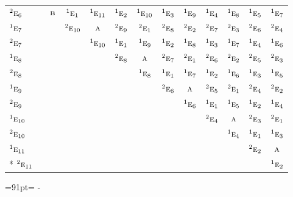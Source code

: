 \documentclass[10pt,a4paper]{article}
\newcommand{\needspace}[1]{\par\penalty-100\begingroup\dimen0=#1\relax\dimen2=\pagegoal
  \advance\dimen2-\pagetotal\ifdim\dimen0>\dimen2\relax\ifdim\dimen2>0pt\vfil\break\fi\fi
  \endgroup}
\numberwithin{equation}{section}
\newcommand{\irr}[1]{\text{\normalfont\scshape #1}}
\newcommand{\conjpair}[1]{{}^{#1}}
\begin{document}
{\begin{longtable}{@{}lcccccccccccc@{}}
$\conjpair{2}\irr{e}_{6}$ &  & $\irr{b}$ & $\conjpair{1}\irr{e}_{1}$ & $\conjpair{1}\irr{e}_{11}$ & $\conjpair{1}\irr{e}_{2}$ & $\conjpair{1}\irr{e}_{10}$ & $\conjpair{1}\irr{e}_{3}$ & $\conjpair{1}\irr{e}_{9}$ & $\conjpair{1}\irr{e}_{4}$ & $\conjpair{1}\irr{e}_{8}$ & $\conjpair{1}\irr{e}_{5}$ & $\conjpair{1}\irr{e}_{7}$\\
$\conjpair{1}\irr{e}_{7}$ &  &  & $\conjpair{2}\irr{e}_{10}$ & $\irr{a}$ & $\conjpair{2}\irr{e}_{9}$ & $\conjpair{2}\irr{e}_{1}$ & $\conjpair{2}\irr{e}_{8}$ & $\conjpair{2}\irr{e}_{2}$ & $\conjpair{2}\irr{e}_{7}$ & $\conjpair{2}\irr{e}_{3}$ & $\conjpair{2}\irr{e}_{6}$ & $\conjpair{2}\irr{e}_{4}$\\
$\conjpair{2}\irr{e}_{7}$ &  &  &  & $\conjpair{1}\irr{e}_{10}$ & $\conjpair{1}\irr{e}_{1}$ & $\conjpair{1}\irr{e}_{9}$ & $\conjpair{1}\irr{e}_{2}$ & $\conjpair{1}\irr{e}_{8}$ & $\conjpair{1}\irr{e}_{3}$ & $\conjpair{1}\irr{e}_{7}$ & $\conjpair{1}\irr{e}_{4}$ & $\conjpair{1}\irr{e}_{6}$\\
$\conjpair{1}\irr{e}_{8}$ &  &  &  &  & $\conjpair{2}\irr{e}_{8}$ & $\irr{a}$ & $\conjpair{2}\irr{e}_{7}$ & $\conjpair{2}\irr{e}_{1}$ & $\conjpair{2}\irr{e}_{6}$ & $\conjpair{2}\irr{e}_{2}$ & $\conjpair{2}\irr{e}_{5}$ & $\conjpair{2}\irr{e}_{3}$\\
$\conjpair{2}\irr{e}_{8}$ &  &  &  &  &  & $\conjpair{1}\irr{e}_{8}$ & $\conjpair{1}\irr{e}_{1}$ & $\conjpair{1}\irr{e}_{7}$ & $\conjpair{1}\irr{e}_{2}$ & $\conjpair{1}\irr{e}_{6}$ & $\conjpair{1}\irr{e}_{3}$ & $\conjpair{1}\irr{e}_{5}$\\
$\conjpair{1}\irr{e}_{9}$ &  &  &  &  &  &  & $\conjpair{2}\irr{e}_{6}$ & $\irr{a}$ & $\conjpair{2}\irr{e}_{5}$ & $\conjpair{2}\irr{e}_{1}$ & $\conjpair{2}\irr{e}_{4}$ & $\conjpair{2}\irr{e}_{2}$\\
$\conjpair{2}\irr{e}_{9}$ &  &  &  &  &  &  &  & $\conjpair{1}\irr{e}_{6}$ & $\conjpair{1}\irr{e}_{1}$ & $\conjpair{1}\irr{e}_{5}$ & $\conjpair{1}\irr{e}_{2}$ & $\conjpair{1}\irr{e}_{4}$\\
$\conjpair{1}\irr{e}_{10}$ &  &  &  &  &  &  &  &  & $\conjpair{2}\irr{e}_{4}$ & $\irr{a}$ & $\conjpair{2}\irr{e}_{3}$ & $\conjpair{2}\irr{e}_{1}$\\
$\conjpair{2}\irr{e}_{10}$ &  &  &  &  &  &  &  &  &  & $\conjpair{1}\irr{e}_{4}$ & $\conjpair{1}\irr{e}_{1}$ & $\conjpair{1}\irr{e}_{3}$\\
$\conjpair{1}\irr{e}_{11}$ &  &  &  &  &  &  &  &  &  &  & $\conjpair{2}\irr{e}_{2}$ & $\irr{a}$\\*
$\conjpair{2}\irr{e}_{11}$ &  &  &  &  &  &  &  &  &  &  &  & $\conjpair{1}\irr{e}_{2}$\\
\bottomrule\end{longtable}}
\needspace{91pt}
\end{document}
